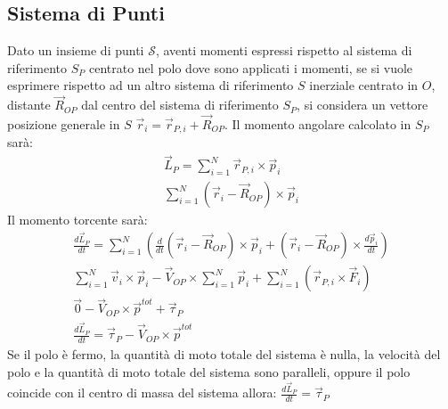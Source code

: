 \documentclass{article}
\numberwithin{equation}{subsection}
\begin{document}
\subsection{Sistema di Punti}
Dato un insieme di punti $\mathscr{S}$, aventi momenti espressi 
rispetto al sistema di riferimento $S_P$ centrato 
nel polo dove sono applicati i momenti, se si vuole 
esprimere rispetto ad un altro sistema di riferimento $S$ 
inerziale centrato in $O$, distante $\vec{R}_{OP}$ dal centro 
del sistema di riferimento $S_P$, si considera un vettore 
posizione generale in $S$ $\vec{r}_i=\vec{r}_{P,i}+\vec{R}_{OP}$.
Il momento angolare calcolato in $S_P$ sarà:
\begin{gather}
    \vec{L}_P=\displaystyle\sum_{i=1}^{N}\vec{r}_{P,i}\times\vec{p}_i\\
    \displaystyle\sum_{i=1}^{N}(\vec{r}_i-\vec{R}_{OP})\times\vec{p}_i
\end{gather}
Il momento torcente sarà:
\begin{gather}
    \displaystyle\frac{d\vec{L}_P}{dt}=\sum_{i=1}^{N}\left(\frac{d}{dt}(\vec{r}_i-\vec{R}_{OP})\times\vec{p}_i+(\vec{r}_i-\vec{R}_{OP})\times\frac{d\vec{p}_i}{dt}\right)\\
    \displaystyle\sum_{i=1}^{N}\vec{v}_i\times\vec{p}_i-\vec{V}_{OP}\times\sum_{i=1}^{N}\vec{p}_i+\sum_{i=1}^{N}(\vec{r}_{P,i}\times\vec{F}_i)\\
    \vec{0}-\vec{V}_{OP}\times\vec{p}^{tot}+\vec{\tau}_P\\
    \displaystyle\frac{d\vec{L}_P}{dt}=\vec{\tau}_P-\vec{V}_{OP}\times\vec{p}^{tot}
\end{gather}
Se il polo è fermo, la quantità di moto totale del sistema è 
nulla, la velocità del polo e la quantità di moto 
totale del sistema sono paralleli, oppure il polo coincide con 
il centro di massa del sistema allora:
$\displaystyle\frac{d\vec{L}_P}{dt}=\vec{\tau}_P$
\end{document}
